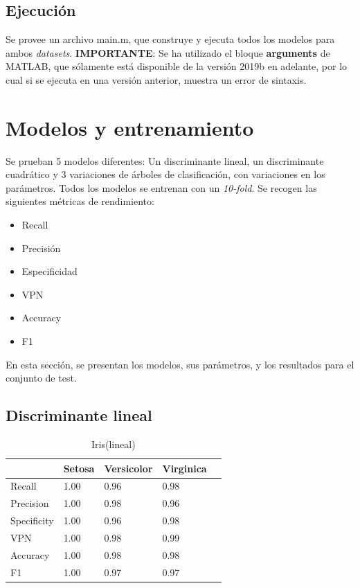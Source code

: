 \documentclass[a4paper,openwrite,12pt]{article}
\begin{document}
\subsection{Ejecución}
Se provee un archivo main.m, que construye y ejecuta todos los modelos para ambos \textit{datasets}. 
\textbf{IMPORTANTE}: Se ha utilizado el bloque \textbf{arguments} de MATLAB, que sólamente está disponible de la versión 2019b en adelante, por lo cual si se ejecuta en una versión anterior, muestra un error de sintaxis.
\section{Modelos y entrenamiento} 
Se prueban 5 modelos diferentes:
Un discriminante lineal, un discriminante cuadrático y 3 variaciones de árboles de clasificación, con variaciones en los parámetros.
Todos los modelos se entrenan con un \textit{10-fold}.
Se recogen las siguientes métricas de rendimiento:
\begin{itemize}
    \item Recall
    \item Precisión
    \item Especificidad
    \item VPN
    \item Accuracy
    \item F1
\end{itemize}

En esta sección, se presentan los modelos, sus parámetros, y los resultados para el conjunto de test.

\subsection{Discriminante lineal}

\begin{table}[H]
\centering
\begin{tabular}{@{}lllll@{}}
\toprule
            & Setosa & Versicolor & Virginica &  \\ \midrule
Recall      & 1.00   & 0.96       & 0.98      &  \\
Precision   & 1.00   & 0.98       & 0.96      &  \\
Specificity & 1.00   & 0.96       & 0.98      &  \\
VPN         & 1.00   & 0.98       & 0.99      &  \\
Accuracy    & 1.00   & 0.98       & 0.98      &  \\
F1          & 1.00   & 0.97       & 0.97      &  \\ \bottomrule
\end{tabular}
\caption{Iris(lineal)}
\end{table}
\end{document}
